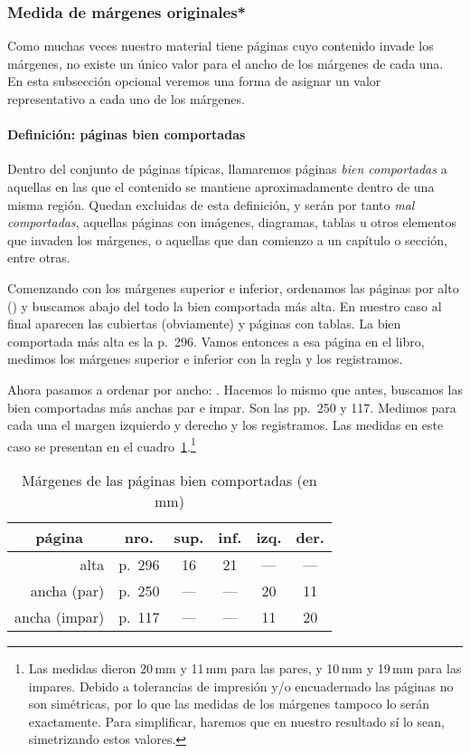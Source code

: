 \documentclass[%
	a5paper,
	10pt,
	twoside,
	openright,
	final,
]{memoir}
\begin{document}
{	\subsubsection{Medida de márgenes originales*} Como muchas veces nuestro material tiene páginas cuyo contenido invade los márgenes, no existe un único valor para el ancho de los márgenes de cada una. En esta subsección opcional veremos una forma de asignar un valor representativo a cada uno de los márgenes.

	\paragraph{Definición: páginas bien comportadas} Dentro del conjunto de páginas típicas, llamaremos páginas \emph{bien comportadas} a aquellas en las que el contenido se mantiene aproximadamente dentro de una misma región. Quedan excluidas de esta definición, y serán por tanto \emph{mal comportadas}, aquellas páginas con imágenes, diagramas, tablas u otros elementos que invaden los márgenes, o aquellas que dan comienzo a un capítulo o sección, entre otras.

	Comenzando con los márgenes superior e inferior, ordenamos las páginas por alto () y buscamos abajo del todo la bien comportada más alta. En nuestro caso al final aparecen las cubiertas (obviamente) y páginas con tablas. La bien comportada más alta es la p.~296. Vamos entonces a esa página en el libro, medimos los márgenes superior e inferior con la regla y los registramos.

	Ahora pasamos a ordenar por ancho: . Hacemos lo mismo que antes, buscamos las bien comportadas más anchas par e impar. Son las pp.~250 y 117. Medimos para cada una el margen izquierdo y derecho y los registramos. Las medidas en este caso se presentan en el cuadro~\ref{tab:pageMargins}.\footnote{Las medidas dieron 20\,mm y 11\,mm para las pares, y 10\,mm y 19\,mm para las impares. Debido a tolerancias de impresión y/o encuadernado las páginas no son simétricas, por lo que las medidas de los márgenes tampoco lo serán exactamente. Para simplificar, haremos que en nuestro resultado sí lo sean, simetrizando estos valores.}

	\begin{table}
		\centering
		\caption{Márgenes de las páginas bien comportadas (en mm)\label{tab:pageMargins}}
		\begin{tabular}{@{}rlcccc@{}}
			\toprule
			\multicolumn{1}{c}{página} & \multicolumn{1}{c}{nro.} & sup. & inf. & izq. & der. \\
			\midrule
			alta & p.~296 & 16 & 21 & --- & --- \\
			ancha (par) & p.~250 & --- & --- & 20 & 11 \\
			ancha (impar) & p.~117 & --- & --- & 11 & 20 \\
			\bottomrule
		\end{tabular}
	\end{table}

}
\end{document}

